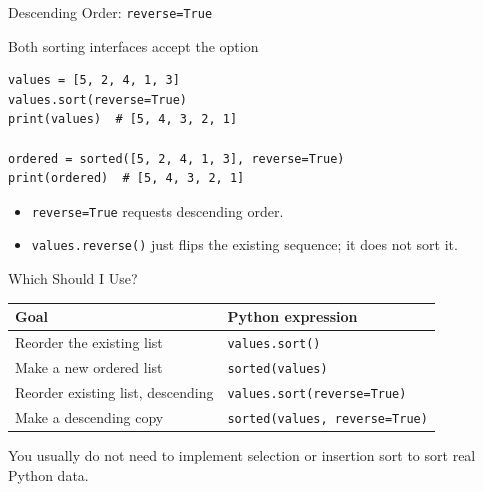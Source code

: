 \documentclass[aspectratio=169,10pt]{beamer}
\begin{document}
\begin{frame}[fragile]{Descending Order: \texttt{reverse=True}}
\small
\begin{block}{Both sorting interfaces accept the option}
\footnotesize
\begin{verbatim}
values = [5, 2, 4, 1, 3]
values.sort(reverse=True)
print(values)  # [5, 4, 3, 2, 1]

ordered = sorted([5, 2, 4, 1, 3], reverse=True)
print(ordered)  # [5, 4, 3, 2, 1]
\end{verbatim}
\end{block}
\begin{itemize}
 \item \texttt{reverse=True} requests descending order.
 \item \texttt{values.reverse()} just flips the existing sequence; it does not sort it.
\end{itemize}
\end{frame}

\begin{frame}{Which Should I Use?}
\small
\begin{center}
\begin{tabular}{ll}
\textbf{Goal} & \textbf{Python expression}\\\hline
Reorder the existing list & \texttt{values.sort()}\\[6pt]
Make a new ordered list & \texttt{sorted(values)}\\[6pt]
Reorder existing list, descending & \texttt{values.sort(reverse=True)}\\[6pt]
Make a descending copy & \texttt{sorted(values, reverse=True)}
\end{tabular}
\end{center}
\begin{keyidea}You usually do not need to implement selection or insertion sort to sort real Python data.\end{keyidea}
\end{frame}

\end{document}

